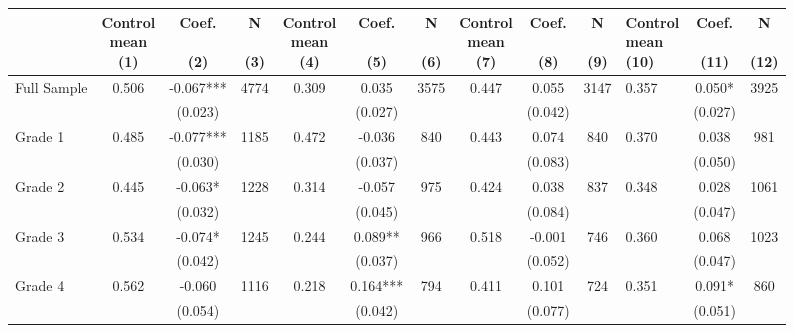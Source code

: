 \begin{table}[!h]
\begin{threeparttable}
\begin{tabular}[t]{lccccccccclcc}
  & \makecell{Control \\ mean \\ (1)} & \makecell{Coef. \\  \\ (2)} & \makecell{N \\ \\ (3)} & \makecell{Control \\ mean \\ (4)} & \makecell{Coef. \\ \\ (5)} & \makecell{N \\ \\ (6)} & \makecell{Control \\ mean \\ (7)} & \makecell{Coef. \\ \\ (8)} & \makecell{N \\ \\ (9)} & \makecell{Control \\ mean \\ (10)} & \makecell{Coef. \\ \\ (11)} & \makecell{N \\ \\ (12)}\\
\midrule
Full Sample & 0.506 & -0.067*** & 4774 & 0.309 & 0.035 & 3575 & 0.447 & 0.055 & 3147 & 0.357 & 0.050* & 3925\\
 &  & (0.023) &  &  & (0.027) &  &  & (0.042) &  &  & (0.027) & \\
Grade 1 & 0.485 & -0.077*** & 1185 & 0.472 & -0.036 & 840 & 0.443 & 0.074 & 840 & 0.370 & 0.038 & 981\\
 &  & (0.030) &  &  & (0.037) &  &  & (0.083) &  &  & (0.050) & \\
Grade 2 & 0.445 & -0.063* & 1228 & 0.314 & -0.057 & 975 & 0.424 & 0.038 & 837 & 0.348 & 0.028 & 1061\\
 &  & (0.032) &  &  & (0.045) &  &  & (0.084) &  &  & (0.047) & \\
Grade 3 & 0.534 & -0.074* & 1245 & 0.244 & 0.089** & 966 & 0.518 & -0.001 & 746 & 0.360 & 0.068 & 1023\\
 &  & (0.042) &  &  & (0.037) &  &  & (0.052) &  &  & (0.047) & \\
Grade 4 & 0.562 & -0.060 & 1116 & 0.218 & 0.164*** & 794 & 0.411 & 0.101 & 724 & 0.351 & 0.091* & 860\\
 &  & (0.054) &  &  & (0.042) &  &  & (0.077) &  &  & (0.051) & \\

\end{tabular}
\end{threeparttable}
\end{table}
